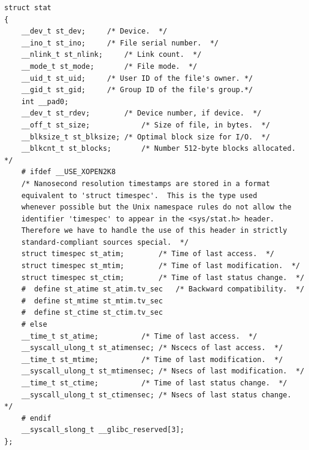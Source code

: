 \begin{lstlisting}[caption={Структура stat}, label={lst:stat}]
struct stat
{
	__dev_t st_dev;		/* Device.  */
	__ino_t st_ino;		/* File serial number.	*/
	__nlink_t st_nlink;		/* Link count.  */
	__mode_t st_mode;		/* File mode.  */
	__uid_t st_uid;		/* User ID of the file's owner.	*/
	__gid_t st_gid;		/* Group ID of the file's group.*/
	int __pad0;
	__dev_t st_rdev;		/* Device number, if device.  */
	__off_t st_size;			/* Size of file, in bytes.  */
	__blksize_t st_blksize;	/* Optimal block size for I/O.  */
	__blkcnt_t st_blocks;		/* Number 512-byte blocks allocated. */
	# ifdef __USE_XOPEN2K8
	/* Nanosecond resolution timestamps are stored in a format
	equivalent to 'struct timespec'.  This is the type used
	whenever possible but the Unix namespace rules do not allow the
	identifier 'timespec' to appear in the <sys/stat.h> header.
	Therefore we have to handle the use of this header in strictly
	standard-compliant sources special.  */
	struct timespec st_atim;		/* Time of last access.  */
	struct timespec st_mtim;		/* Time of last modification.  */
	struct timespec st_ctim;		/* Time of last status change.  */
	#  define st_atime st_atim.tv_sec	/* Backward compatibility.  */
	#  define st_mtime st_mtim.tv_sec
	#  define st_ctime st_ctim.tv_sec
	# else
	__time_t st_atime;			/* Time of last access.  */
	__syscall_ulong_t st_atimensec;	/* Nscecs of last access.  */
	__time_t st_mtime;			/* Time of last modification.  */
	__syscall_ulong_t st_mtimensec;	/* Nsecs of last modification.  */
	__time_t st_ctime;			/* Time of last status change.  */
	__syscall_ulong_t st_ctimensec;	/* Nsecs of last status change.  */
	# endif
	__syscall_slong_t __glibc_reserved[3];
};
\end{lstlisting}
